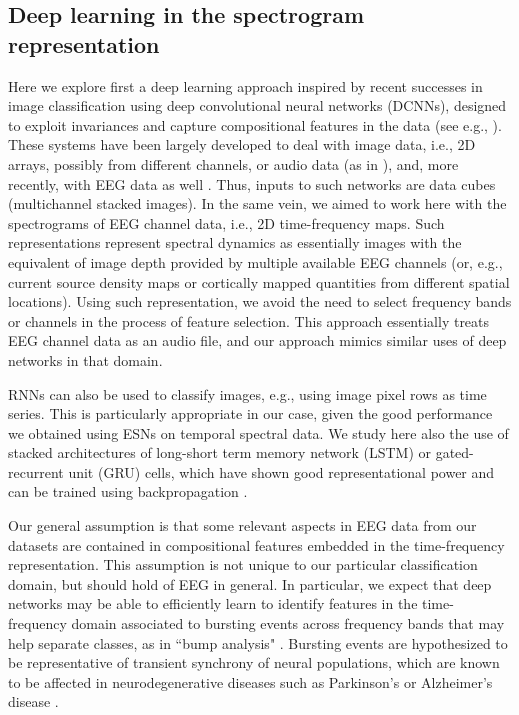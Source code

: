 \documentclass[review]{elsarticle}
\begin{document}
 \subsection{Deep learning in the spectrogram representation}
Here we explore first a deep learning approach inspired by recent successes in image classification using deep convolutional neural networks (DCNNs), designed to exploit invariances and capture compositional features in the data (see e.g., \cite{Goodfellow2016,Poggio2016,Ruffini:2016ae}). These systems have been largely developed to deal with image data, i.e., 2D arrays, possibly from different channels, or audio data (as in \cite{Oord2013}), and, more recently, with EEG data as well \citep{Tsinalis:2016aa,Vilamala:2017aa}. Thus, inputs to such networks are data cubes (multichannel stacked images). In the same vein, we aimed to work here with the spectrograms of EEG channel data, i.e., 2D time-frequency maps. Such representations represent spectral dynamics as essentially images with the equivalent of image depth provided by multiple available EEG channels (or, e.g., current source density maps or cortically mapped quantities from different spatial locations). Using such representation, we avoid the need to select frequency bands or channels in the process of feature selection. This approach essentially treats EEG channel data as an audio file, and our approach mimics similar uses of deep networks in that domain. 

RNNs can also be used to classify images, e.g., using image pixel rows as time series. This is particularly appropriate in our case, given the good performance we obtained using ESNs on temporal spectral data. We study here also the use of stacked architectures of long-short term memory network (LSTM) or gated-recurrent unit (GRU) cells, which have shown good representational power and can be trained using backpropagation \cite{Hochreiter:1997aa,Goodfellow2016,Cho:2014aa}.

 Our general assumption is that some relevant aspects in EEG data from our datasets are contained in compositional features embedded in the time-frequency representation. This assumption is not unique to our particular classification domain, but should hold of EEG in general. In particular, we expect that deep networks may be able to efficiently learn to identify features in the time-frequency domain associated to bursting events across frequency bands that may help separate classes, as in ``bump analysis" \citep{Dauwels:2010aa}. Bursting events are hypothesized to be representative of transient synchrony of neural populations, which are known to be affected in neurodegenerative diseases such as Parkinson's or Alzheimer's disease \citep{Uhlhaas:2016aa}.
 
\end{document}
